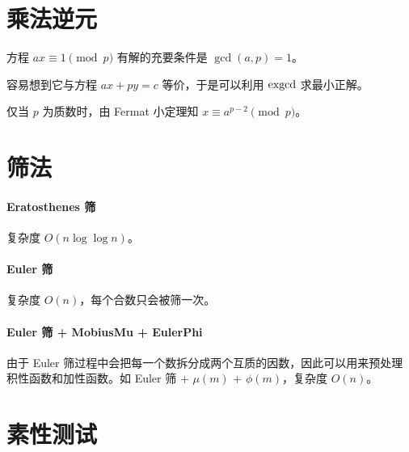 \documentclass{probook}
\begin{document}
\begin{multicols}{2}
\section{乘法逆元}

方程 $ax \equiv 1 \pmod p$ 有解的充要条件是 $\gcd(a,p) = 1$。

容易想到它与方程 $ax + py = c$ 等价，于是可以利用 $\rm exgcd$ 求最小正解。



仅当 $p$ 为质数时，由 Fermat 小定理知 $x \equiv a^{p-2} \pmod p$。



\section{筛法}

\paragraph{Eratosthenes 筛}

复杂度 $O(n\log \log n)$。



\paragraph{Euler 筛}

复杂度 $O(n)$，每个合数只会被筛一次。



\paragraph{Euler 筛 + MobiusMu + EulerPhi}

由于 Euler 筛过程中会把每一个数拆分成两个互质的因数，因此可以用来预处理积性函数和加性函数。如 Euler 筛 + $\mu(m)$ + $\phi(m)$，复杂度 $O(n)$。



\section{素性测试}


\end{multicols}
\end{document}
